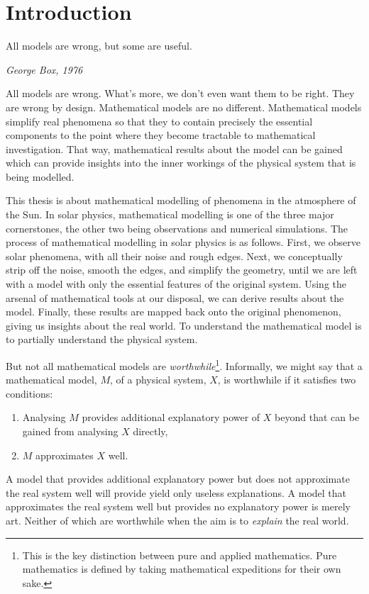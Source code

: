 \documentclass[12pt]{../style-files/ociamthesis}
\begin{document}
\baselineskip=18pt

\setcounter{secnumdepth}{3}
\setcounter{tocdepth}{3}

\newcommand{\bv}{\mathbf{v}}
\newcommand{\bB}{\mathbf{B}}

\newcommand{\figdir}{../main/figures/chpt-1/} %


\chapter{Introduction}
\label{chap:intro}

\epigraph{All models are wrong, but some are useful.}{\textit{George Box, 1976}}

All models are wrong. What's more, we don't even want them to be right. They are wrong by design. Mathematical models are no different. Mathematical models simplify real phenomena so that they to contain precisely the essential components to the point where they become tractable to mathematical investigation. That way, mathematical results about the model can be gained which can provide insights into the inner workings of the physical system that is being modelled.

This thesis is about mathematical modelling of phenomena in the atmosphere of the Sun. In solar physics, mathematical modelling is one of the three major cornerstones, the other two being observations and numerical simulations. The process of mathematical modelling in solar physics is as follows. First, we observe solar phenomena, with all their noise and rough edges. Next, we conceptually strip off the noise, smooth the edges, and simplify the geometry, until we are left with a model with only the essential features of the original system. Using the arsenal of mathematical tools at our disposal, we can derive results about the model. Finally, these results are mapped back onto the original phenomenon, giving us insights about the real world. To understand the mathematical model is to partially understand the physical system.

But not all mathematical models are \textit{worthwhile}\footnote{This is the key distinction between pure and applied mathematics. Pure mathematics is defined by taking mathematical expeditions for their own sake.}. Informally, we might say that a mathematical model, $M$, of a physical system, $X$, is worthwhile if it satisfies two conditions:
\begin{enumerate}
	\item Analysing $M$ provides additional explanatory power of $X$ beyond that can be gained from analysing $X$ directly,
	\item $M$ approximates $X$ well. \label{approx}
\end{enumerate}
A model that provides additional explanatory power but does not approximate the real system well will provide yield only useless explanations. A model that approximates the real system well but provides no explanatory power is merely art. Neither of which are worthwhile when the aim is to \textit{explain} the real world.
\end{document}
